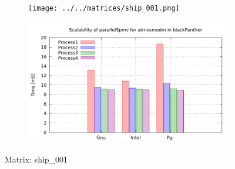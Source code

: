 \begin{figure} [ht!]
    \centering
    \captionsetup{justification=centering, singlelinecheck=false}
    \begin{subfigure}{.65\textwidth}
      \centering
      \hspace*{-3.5cm} 
      \texttt{[image: ../../matrices/ship\_001.png]}
      \label{fig:ship_001_matrix}
    \end{subfigure}%
    \begin{subfigure}{.65\textwidth}
      \centering
      \hspace*{-6.0cm} 
      \includegraphics[page=7, width=0.95\linewidth]{../plots/blackPanther.pdf}
      \label{fig:ship_001_performance}
    \end{subfigure}
\caption{Matrix: ship\_001}
\label{fig:ship_001}
\end{figure}

